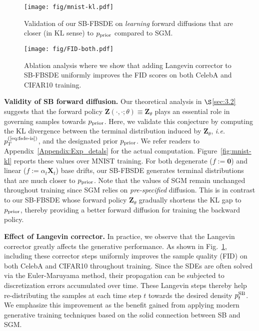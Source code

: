\documentclass{article}
\def\eqref#1{(\ref{#1})}
\def\rvX{{\mathbf{X}}}
\def\rvZ{{\mathbf{Z}}}
\newcommand{\ie}{{\ignorespaces\emph{i.e.}}{ }}
\begin{document}
\begin{figure}[t]
  \vskip -0.1in
  \begin{minipage}{0.43\textwidth}
    \centering
    \texttt{[image: fig/mnist-kl.pdf]}
    \vskip -0.1in
    \caption{
      Validation of our SB-FBSDE on \textit{learning} forward diffusions
      that are closer (in KL sense) to ${ p_\text{\normalfont{prior}} }$ compared to SGM.
    }
    \label{fig:mnist-kl}
  \end{minipage}
  \hfill
  \begin{minipage}{0.55\textwidth}
    \centering
    \texttt{[image: fig/FID-both.pdf]}
    \vskip -0.1in
    \caption{
        Ablation analysis where we show that adding Langevin corrector to SB-FBSDE
        uniformly improves the FID scores on both CelebA and CIFAR10 training.
    }
    \label{fig:fid}
  \end{minipage}
\vskip -0.1in
\end{figure}


\textbf{Validity of SB forward diffusion.}
Our theoretical analysis in $\S$\ref{sec:3.2}
suggests that the forward policy ${\rvZ}(\cdot,\cdot;\theta)\equiv\rvZ_\theta$ plays
an essential role in governing samples towards ${ p_\text{\normalfont{prior}} }$.
Here, we validate this conjecture by computing the KL divergence between
the terminal distribution induced by $\rvZ_\theta$,
\ie $\pp{T}{\eqref{eq:fsde-is}}$,
and the designated prior ${ p_\text{\normalfont{prior}} }$.
We refer readers to Appendix~\ref{Appendix:Exp_detals} for the actual computation.
Figure~\ref{fig:mnist-kl} reports these values over MNIST training.
For both degenerate ($f:=\mathbf{0}$) and linear ($f:=\alpha_t\rvX_t$) base drifts,
our SB-FBSDE generates terminal distributions that are much closer to ${ p_\text{\normalfont{prior}} }$.
Note that the values of SGM remain unchanged throughout training since SGM relies on \textit{pre-specified} diffusion.
This is in contrast to our SB-FBSDE whose forward policy $\rvZ_\theta$
gradually shortens the KL gap to ${ p_\text{\normalfont{prior}} }$,
thereby providing a better forward diffusion for training the backward policy.




\textbf{Effect of Langevin corrector.}
In practice,
we observe that the Langevin corrector greatly affects the generative performance.
As shown in Fig.~\ref{fig:fid},
including these corrector steps uniformly improves the sample quality (FID) on both CelebA and CIFAR10 throughout training.
Since the SDEs are often solved via the Euler-Maruyama method,
their propagation can be subjected to discretization errors accumulated over time.
These Langevin steps thereby help
re-distributing the samples at each time step $t$ towards the desired density $p_{t}^{\text{\normalfont{SB}}}$.
We emphasize
this improvement
as the benefit gained from
applying modern generative training techniques based on
the solid connection between SB and SGM.
\end{document}
